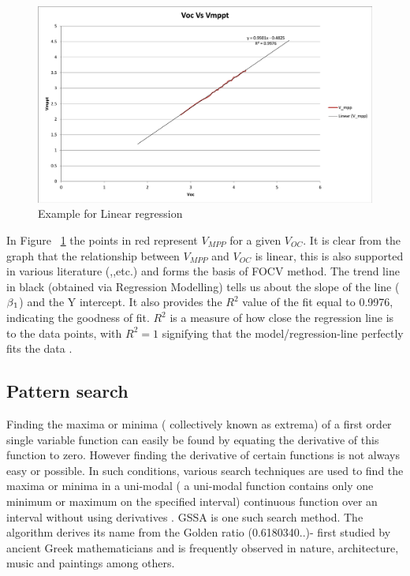 {\begin{figure}[H]
  \begin{center}
  \includegraphics[width=\textwidth]{images/Reg_line}
  \caption{ Example for Linear regression }
  \label{fig:linear_regression}
  \end{center}
  \end{figure}


In Figure ~\ref{fig:linear_regression} the points in red represent $V_{MPP}$ for a given $V_{OC}$. It is clear from the graph that the relationship between $V_{MPP}$ and $V_{OC}$ is linear, this is also supported in various literature (\cite{reza2013classification},\cite{esram2007comparison},etc.) and forms the basis of \ac{FOCV} method. The trend line in black (obtained via Regression Modelling) tells us about the slope of the line ($\beta\textsubscript{1}$) and the Y intercept. It also provides the $R^{2}$ value of the fit equal to 0.9976, indicating the goodness of fit. $R^{2}$ is a measure of how close the regression line is to the data points, with $R^{2} = 1 $ signifying that the model/regression-line perfectly fits the data \cite{Jim_R_squared}.


\subsection{Pattern search}


Finding the maxima or minima ( collectively known as extrema) of a first order single variable function can easily be found by equating the derivative of this function to zero. However finding the derivative of certain functions is not always easy or possible. In such conditions, various search techniques are used to find the maxima or minima  in a uni-modal ( a uni-modal function contains only one minimum or maximum on the specified interval) continuous function over an interval without using derivatives \cite{seiler1989numerical}. \ac{GSSA} is one such search method. The algorithm derives its name from the Golden ratio (0.6180340..)- first studied by ancient Greek mathematicians and is frequently observed in nature, architecture, music and paintings among others.\\

}
